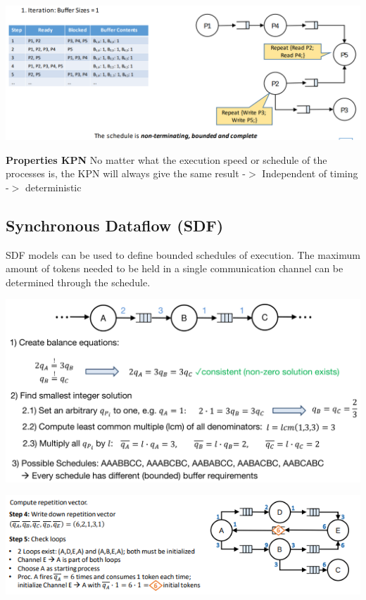 \documentclass[english]{latex4ei/latex4ei_sheet}
\begin{document}
\begin{center}
  \includegraphics[width=0.8\linewidth]{assets/KPNExamplePark.png}
  \label{fig:kpnexamplepark}
\end{center}
 
\textbf{Properties KPN} No matter what the execution speed or schedule of the processes is, the KPN will always give the same result -$>$ Independent of timing -$>$ deterministic

\subsection{Synchronous Dataflow (SDF)}
SDF models can be used to define bounded schedules of execution. The maximum amount of
tokens needed to be held in a single communication channel can be determined through the
schedule.

\begin{center}
  \includegraphics[width=\linewidth]{assets/SDFExample.png}
  \label{fig:sdfexample}
\end{center}
 
\begin{center}
  \includegraphics[width=\linewidth]{assets/SDFExample2.png}
  \label{fig:sdfexample2}
\end{center}
\end{document}
